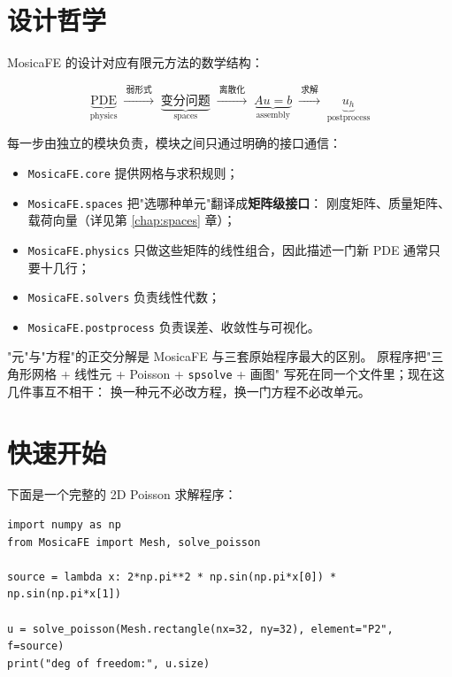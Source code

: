 \documentclass[UTF8,11pt,oneside]{ctexbook}
\theoremstyle{definition}
\theoremstyle{plain}
\newenvironment{important}{%
  \begin{tcolorbox}[colback=blue!5,colframe=blue!45,title=要点,fonttitle=\bfseries]%
}{%
  \end{tcolorbox}%
}
\newcommand{\mosica}{\textsf{MosicaFE}}
\newcommand{\code}[1]{\texttt{#1}}
\newcommand{\module}[1]{\texttt{MosicaFE.#1}}
\begin{document}
\section{设计哲学}

\mosica{} 的设计对应有限元方法的数学结构：

\begin{equation}
\underbrace{\text{PDE}}_{\text{physics}}
\;\xrightarrow{\ \text{弱形式}\ }\;
\underbrace{\text{变分问题}}_{\text{spaces}}
\;\xrightarrow{\ \text{离散化}\ }\;
\underbrace{Au=b}_{\text{assembly}}
\;\xrightarrow{\ \text{求解}\ }\;
\underbrace{u_h}_{\text{postprocess}}
\label{eq:philosophy}
\end{equation}

每一步由独立的模块负责，模块之间只通过明确的接口通信：

\begin{itemize}[itemsep=0.2em]
  \item \module{core} 提供网格与求积规则；
  \item \module{spaces} 把"选哪种单元"翻译成\textbf{矩阵级接口}：
        刚度矩阵、质量矩阵、载荷向量（详见第 \ref{chap:spaces} 章）；
  \item \module{physics} 只做这些矩阵的线性组合，因此描述一门新 PDE 通常只要十几行；
  \item \module{solvers} 负责线性代数；
  \item \module{postprocess} 负责误差、收敛性与可视化。
\end{itemize}

\begin{important}
"元"与"方程"的正交分解是 \mosica{} 与三套原始程序最大的区别。
原程序把"三角形网格 + 线性元 + Poisson + \code{spsolve} + 画图"
写死在同一个文件里；现在这几件事互不相干：
换一种元不必改方程，换一门方程不必改单元。
\end{important}

\section{快速开始}

下面是一个完整的 2D Poisson 求解程序：

\begin{lstlisting}[language=MosicaFE,caption={示例 1.1：两行求解 Poisson 方程},label={lst:quickstart}]
import numpy as np
from MosicaFE import Mesh, solve_poisson

source = lambda x: 2*np.pi**2 * np.sin(np.pi*x[0]) * np.sin(np.pi*x[1])

u = solve_poisson(Mesh.rectangle(nx=32, ny=32), element="P2", f=source)
print("deg of freedom:", u.size)
\end{lstlisting}
\end{document}
